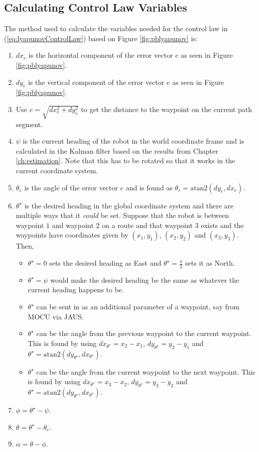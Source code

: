 \subsection{Calculating Control Law Variables}
\label{sec:lyapunovVariables}
The method used to calculate the variables needed for the control law in (\ref{eq:lyapunovControlLaw}) based on Figure \ref{fig:pblyapunov} is:
\begin{enumerate}
\item $dx_e$ is the horizontal component of the error vector $e$ as seen in Figure \ref{fig:pblyapunov}.
\item $dy_e$ is the vertical component of the error vector $e$ as seen in Figure \ref{fig:pblyapunov}.
\item Use $e = \sqrt{dx_e^2 + dy_e^2}$ to get the distance to the waypoint on the current path segment.
\item $\psi$ is the current heading of the robot in the world coordinate frame and is calculated in the Kalman filter based on the results from Chapter \ref{ch:estimation}. Note that this has to be rotated so that it works in the current coordinate system.
\item $\theta_e$ is the angle of the error vector $e$ and is found as $\theta_e = \text{atan2}(dy_e,dx_e)$.
\item $\theta^\star$ is the desired heading in the global coordinate system and there are multiple ways that it \textit{could} be set. Suppose that the robot is between waypoint $1$ and waypoint $2$ on a route and that waypoint $3$ exists and the waypoints have coordinates given by $(x_1,y_1)$, $(x_2,y_2)$ and $(x_3,y_3)$. Then,
\begin{itemize}
\item $\theta^\star=0$ sets the desired heading as East and $\theta^\star=\frac{\pi}{2}$ sets it as North.
\item $\theta^\star=\psi$ would make the desired heading be the same as whatever the current heading happens to be.
\item $\theta^\star$ can be sent in as an additional parameter of a waypoint, say from MOCU via JAUS.
\item $\theta^\star$ can be the angle from the previous waypoint to the current waypoint. This is found by using $dx_{\theta^\star}=x_2-x_1$, $dy_{\theta^\star}=y_2-y_1$ and $\theta^\star=\text{atan2}(dy_{\theta^\star},dx_{\theta^\star})$.
\item $\theta^\star$ can be the angle from the current waypoint to the next waypoint. This is found by using $dx_{\theta^\star}=x_3-x_2$, $dy_{\theta^\star}=y_3-y_2$ and $\theta^\star=\text{atan2}(dy_{\theta^\star},dx_{\theta^\star})$.
\end{itemize}
\item $\phi=\theta^\star-\psi$.
\item $\theta=\theta^\star - \theta_e$.
\item $\alpha = \theta - \phi$.
\end{enumerate}

